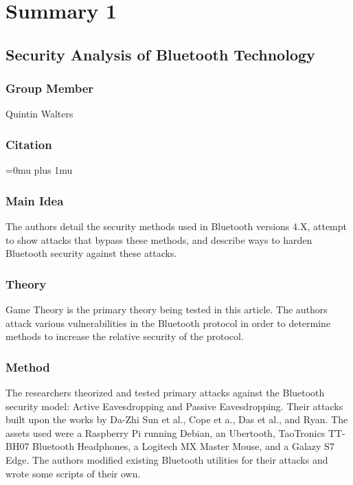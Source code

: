 \section{Summary 1}

\noindent
\subsection{Security Analysis of Bluetooth Technology}

\subsubsection{Group Member}

\noindent
Quintin Walters

\noindent
\subsubsection{Citation}

\Urlmuskip=0mu plus 1mu\relax
{}

\subsubsection{Main Idea}

\noindent
The authors detail the security methods used in Bluetooth versions 4.X, attempt to show attacks that bypass these methods, and describe ways to harden Bluetooth security against these attacks.  

\subsubsection{Theory}

\noindent
Game Theory is the primary theory being tested in this article.  The authors attack various vulnerabilities in the Bluetooth protocol in order to determine methods to increase the relative security of the protocol.

\subsubsection{Method}

\noindent
The researchers theorized and tested primary attacks against the Bluetooth security model: Active Eavesdropping and Passive Eavesdropping.  Their attacks built upon the works by Da-Zhi Sun et al., Cope et a., Das et al., and Ryan.  The assets used were a Raspberry Pi running Debian, an Ubertooth, TaoTronics TT-BH07 Bluetooth Headphones, a Logitech MX Master Mouse, and a Galazy S7 Edge.  The authors modified existing Bluetooth utilities for their attacks and wrote some scripts of their own.

